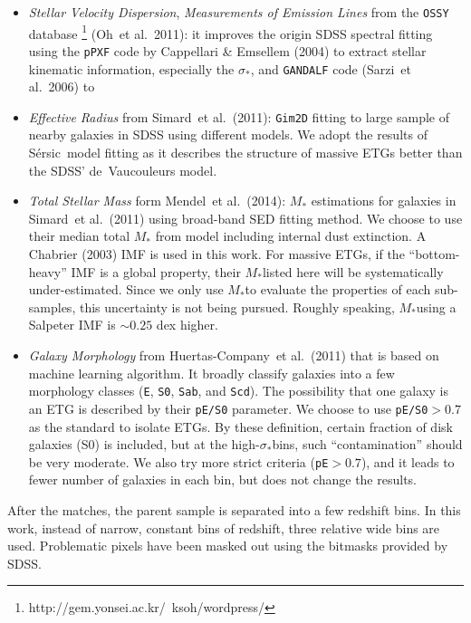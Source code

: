 \documentclass[preprint]{aastex}
\def\etal{{\ et al.~}}
\def\ser{{S\'{e}rsic\ }}
\def\mstar{$M_{\ast}$}
\def\sigstar{$\sigma_{\ast}$}
\begin{document}
\begin{CJK*}{UTF8}{gbsn}
  \begin{itemize}
      \item {\it Stellar Velocity Dispersion}, {\it Measurements of
          Emission Lines} from the {\tt OSSY} database 
          \footnote{http://gem.yonsei.ac.kr/~ksoh/wordpress/} (Oh\etal 2011): 
          it improves the origin SDSS spectral fitting using the {\tt pPXF} 
          code by Cappellari \& Emsellem (2004) to extract stellar kinematic 
          information, especially the \sigstar, and {\tt GANDALF} 
          code (Sarzi\etal 2006) to 
      \item {\it Effective Radius} from Simard\etal (2011): {\tt Gim2D} 
          fitting to large sample of nearby galaxies in SDSS using different 
          models.  We adopt the results of \ser model fitting as it describes 
          the structure of massive ETGs better than the SDSS' de~Vaucouleurs 
          model.  
      \item {\it Total Stellar Mass} form Mendel\etal (2014): \mstar 
          estimations for galaxies in Simard\etal (2011) using broad-band SED
          fitting method.  We choose to use their median total \mstar 
          from model including internal dust extinction.  A Chabrier (2003) 
          IMF is used in this work.  For massive ETGs, if the ``bottom-heavy'' IMF
          is a global property, their \mstar listed here will be systematically 
          under-estimated.  Since we only use \mstar to evaluate the properties 
          of each sub-samples, this uncertainty is not being pursued.  Roughly 
          speaking, \mstar using a Salpeter IMF is $\sim 0.25$ dex higher. 
      \item {\it Galaxy Morphology} from Huertas-Company\etal (2011) 
          that is based on machine learning algorithm.  It broadly classify 
          galaxies into a few morphology classes ({\tt E}, {\tt S0}, {\tt Sab}, 
          and {\tt Scd}).  The possibility that one galaxy is an ETG is described 
          by their {\tt pE/S0} parameter.  We choose to use {\tt pE/S0}$ > 0.7$
          as the standard to isolate ETGs.  By these definition, certain fraction 
          of disk galaxies (S0) is included, but at the high-\sigstar bins, 
          such ``contamination'' should be very moderate.  We also try more strict 
          criteria ({\tt pE}$ >  0.7$), and it leads to fewer number of galaxies 
          in each bin, but does not change the results.
  \end{itemize}
  
  After the matches, the parent sample is separated into a few redshift bins.  
  In this work, instead of narrow, constant bins of redshift, three relative 
  wide bins are used.  Problematic pixels have been masked out using the bitmasks 
  provided by SDSS.  
   

\end{CJK*}
\end{document}
